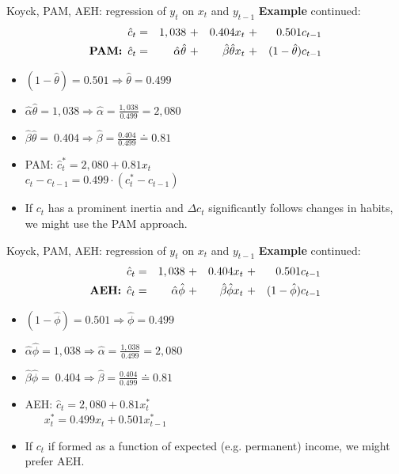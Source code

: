 \documentclass{beamer}
\begin{document}
\begin{frame}{Koyck, PAM, AEH: regression of $y_t$ on $x_t$ and $y_{t-1}$}
\textbf{Example} continued:
\begin{equation*}
\begin{aligned}
\hat{c}_t & = &1,038~&+ &0.404 x_t~ &+ &0.501 c_{t-1} \\
\textnormal{\textbf{PAM:}} \,\,\, \hat{c}_t& = &\hat{\alpha} \hat{\theta}~&+ &\hat{\beta} \hat{\theta} x_t~&+ &(1-\hat{\theta}) c_{t-1} 
\end{aligned}
\end{equation*}
\begin{itemize}
\item $(1-\hat{\theta})=0.501 \Rightarrow \hat{\theta} = 0.499$
\smallskip
\item $\hat{\alpha} \hat{\theta} = 1,038 \Rightarrow \hat{\alpha}= \frac{1,038}{0.499}=2,080$
\item $\hat{\beta} \hat{\theta} = ~ 0.404 \Rightarrow \hat{\beta}= \frac{0.404}{0.499} \doteq 0.81$
\bigskip
\item PAM: $\hat{c}_t^{\ast} = 2,080 + 0.81 x_t$\\
\smallskip
$c_t - c_{t-1} = 0.499 \cdot (c_t^{\ast}-c_{t-1})$
\bigskip
\item If $c_t$ has a prominent inertia and $\Delta c_t$ significantly follows changes in habits, we might use the PAM approach.
\end{itemize}
\end{frame}
\begin{frame}{Koyck, PAM, AEH: regression of $y_t$ on $x_t$ and $y_{t-1}$}
\textbf{Example} continued:
\begin{equation*}
\begin{aligned}
\hat{c}_t & = &1,038~&+ &0.404 x_t~ &+ &0.501 c_{t-1} \\
\textnormal{\textbf{AEH:}} \,\,\, \hat{c}_t& = &\hat{\alpha} \hat{\phi}~&+ &\hat{\beta} \hat{\phi} x_t~&+ &(1-\hat{\phi}) c_{t-1} 
\end{aligned}
\end{equation*}
\begin{itemize}
\item $(1-\hat{\phi})=0.501 \Rightarrow \hat{\phi} = 0.499$
\smallskip
\item $\hat{\alpha} \hat{\phi} = 1,038 \Rightarrow \hat{\alpha}= \frac{1,038}{0.499}=2,080$
\item $\hat{\beta} \hat{\phi} = ~ 0.404 \Rightarrow \hat{\beta}= \frac{0.404}{0.499} \doteq 0.81$
\bigskip
\item AEH: $\hat{c}_t = 2,080 + 0.81 x_t^{\ast}$\\
\smallskip
$~~~~~~~\,x_t^{\ast} = 0.499 x_t + 0.501 x_{t-1}^{\ast}$
\bigskip
\item If $c_t$ if formed as a function of expected (e.g. permanent) income, we might prefer AEH.
\end{itemize}
\end{frame}
\end{document}
